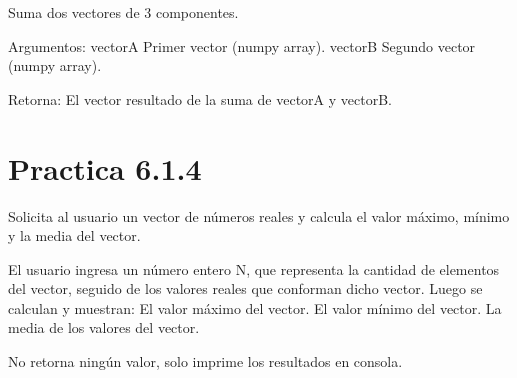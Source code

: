 \documentclass[letterpaper,10pt,spanish]{sphinxmanual}
\begin{document}
\begin{fulllineitems}
\label{\detokenize{pr6:pr6.1_3.suma}}
\pysigstartsignatures
{}
\pysigstopsignatures
\sphinxAtStartPar
Suma dos vectores de 3 componentes.

\sphinxAtStartPar
Argumentos:
vectorA \textendash{} Primer vector (numpy array).
vectorB \textendash{} Segundo vector (numpy array).

\sphinxAtStartPar
Retorna:
El vector resultado de la suma de vectorA y vectorB.

\end{fulllineitems}



\section{Practica 6.1.4}
\label{\detokenize{pr6:module-pr6.1_4}}\label{\detokenize{pr6:practica-6-1-4}}

\begin{fulllineitems}
\label{\detokenize{pr6:pr6.1_4.ejecutar_calculos}}
\pysigstartsignatures
{}
\pysigstopsignatures
\sphinxAtStartPar
Solicita al usuario un vector de números reales y calcula el valor máximo, mínimo y la media del vector.

\sphinxAtStartPar
El usuario ingresa un número entero N, que representa la cantidad de elementos del vector,
seguido de los valores reales que conforman dicho vector. Luego se calculan y muestran:
\sphinxhyphen{} El valor máximo del vector.
\sphinxhyphen{} El valor mínimo del vector.
\sphinxhyphen{} La media de los valores del vector.

\sphinxAtStartPar
No retorna ningún valor, solo imprime los resultados en consola.

\end{fulllineitems}

\end{document}
